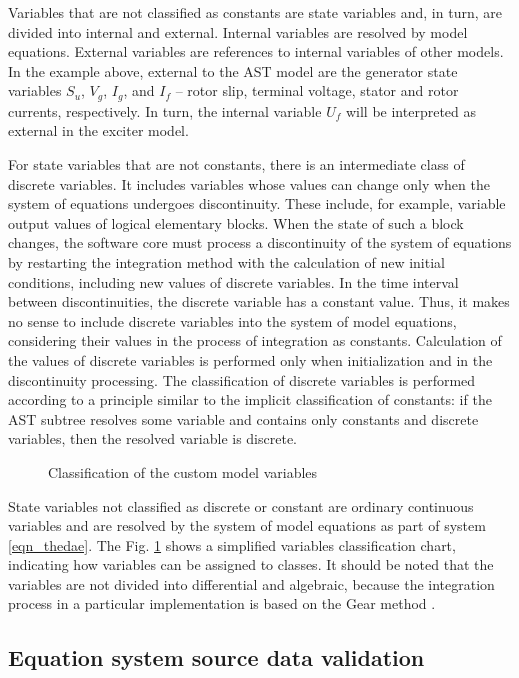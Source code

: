 \documentclass[lettersize,journal]{IEEEtran}
\begin{document}
Variables that are not classified as constants are state variables and, in turn, are divided into internal and external. 
Internal variables are resolved by model equations. External variables are references to internal variables of other models. 
In the example above, external to the AST model are the generator state variables \(S_u\), \(V_g\), \(I_g\), and \(I_f\) – 
rotor slip, terminal voltage, stator and rotor currents, respectively. In turn, the internal variable \(U_f\) will be interpreted as
external in the exciter model.

For state variables that are not constants, there is an intermediate class of discrete variables. It includes variables whose 
values can change only when the system of equations undergoes discontinuity. These include, for example, variable output values of
logical elementary blocks. When the state of such a block changes, the software core must process a
discontinuity of the system of equations by restarting the integration method with the calculation of new initial conditions,
including new values of discrete variables. In the time interval between discontinuities, the discrete variable has a constant
value. Thus, it makes no sense to include discrete variables into the system of model equations, considering their values in the
process of integration as constants. Calculation of the values of discrete variables is performed only when initialization and in
the discontinuity processing. The classification of discrete variables is performed according to a principle similar 
to the implicit classification of constants: if the AST subtree resolves some variable and contains only constants and discrete
variables, then the resolved variable is discrete.

\begin{figure}[h]
	\centering
	\caption{Classification of the custom model variables}
	\label{fig_vars}
\end{figure}

State variables not classified as discrete or constant are ordinary continuous variables and are resolved by the system of model
equations as part of system \eqref{eqn_thedae}. The Fig. \ref{fig_vars} shows a simplified variables classification chart,
indicating how variables can be assigned to classes. 
It should be noted that the variables are not divided into differential and algebraic, because the 
integration process in a particular implementation is based on the Gear method \cite{texbook}.

\subsection {Equation system source data validation} \label{sec_validation}
\end{document}
